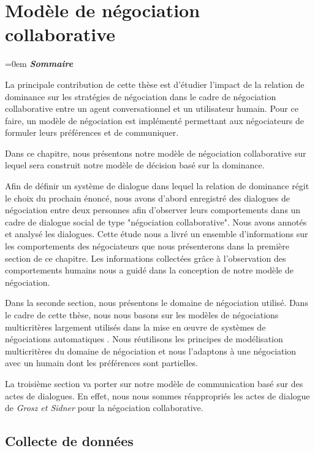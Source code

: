 	\chapter{Modèle de négociation collaborative}
\label{chap:chap3}
\begingroup
\parindent=0em
\emph{\textbf{Sommaire}}
\localtableofcontents 
\clearpage
\endgroup

La principale contribution de cette thèse est d'étudier l'impact de la relation de dominance sur les stratégies de négociation dans le cadre de négociation collaborative entre un agent conversationnel et un utilisateur humain. 
Pour ce faire, un modèle de négociation est implémenté permettant aux négociateurs de formuler leurs préférences et de communiquer. 

Dans ce chapitre, nous présentons notre modèle de négociation collaborative sur lequel sera construit notre modèle de décision basé sur la dominance. 

Afin de définir un système de dialogue dans lequel la relation de dominance régit le choix du prochain énoncé, nous avons d'abord enregistré des dialogues de négociation entre deux personnes afin d'observer leurs comportements dans un cadre de dialogue social de type "négociation collaborative". Nous avons annotés et analysé les dialogues. Cette étude nous a livré un ensemble d'informations sur les comportements des négociateurs que nous présenterons dans la première section de ce chapitre. 
Les informations collectées grâce à l'observation des comportements humains nous a guidé dans la conception de notre modèle de négociation.

Dans la seconde section, nous présentons le domaine de négociation utilisé. Dans le cadre de cette thèse, nous nous basons sur les modèles de négociations multicritères largement utilisés dans la mise en œuvre de systèmes de négociations automatiques \cite{jonker2007agent,lai2004literature,lai2008decentralized}. Nous réutilisons les principes de modélisation multicritères du domaine de négociation et nous l'adaptons à une négociation avec un humain dont les préférences sont partielles.  

La troisième section va porter sur notre modèle de communication basé sur des actes de dialogues. En effet, nous nous sommes réappropriés les actes de dialogue de \emph{Grosz et Sidner} \cite{grosz1986attention} pour la négociation collaborative.


\section{Collecte de données}

